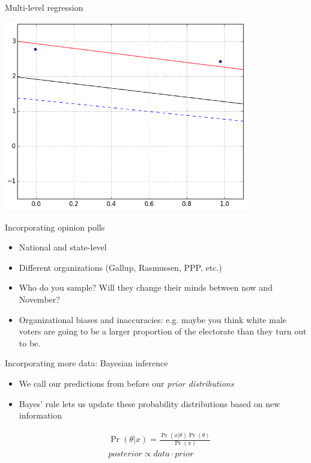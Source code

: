 \documentclass[14pt, t]{beamer}
\begin{document}
\begin{frame}{Multi-level regression}
\begin{center}
	\includegraphics[width=0.8\textwidth]{mixed-effects.png}
	\end{center}
\end{frame}

\begin{frame}{Incorporating opinion polls}
\begin{itemize}
\item National and state-level
\item Different organizations (Gallup, Rasmussen, PPP, etc.)
\item Who do you sample? Will they change their minds between now and November?
\item Organizational biases and inaccuracies: e.g. maybe you think white male voters are going to be a larger proportion of the electorate than they turn out to be.
\end{itemize}
\end{frame}

\begin{frame}{Incorporating more data: Bayesian inference}
\begin{itemize}
	\item We call our predictions from before our \emph{prior distributions}
	\item Bayes' rule lets us update these probability distributions based on new information
\end{itemize}
\begin{align*}
		&\Pr(\theta|x) = \frac{\Pr(x|\theta) \Pr(\theta)}{\Pr(x)} \\
		&posterior \propto data \cdot prior
	\end{align*}
\end{frame}
\end{document}
